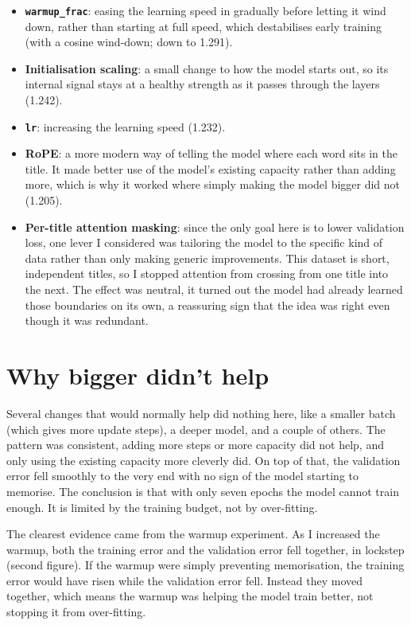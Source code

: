 \documentclass[11pt]{article}
\begin{document}
\begin{itemize}
\setlength{\itemsep}{2pt}
\item \textbf{\texttt{warmup\_frac}}: easing the learning speed in gradually before
letting it wind down, rather than starting at full speed, which destabilises early
training (with a cosine wind-down; down to 1.291).
\item \textbf{Initialisation scaling}: a small change to how the model starts out,
so its internal signal stays at a healthy strength as it passes through the layers
(1.242).
\item \textbf{\texttt{lr}}: increasing the learning speed (1.232).
\item \textbf{RoPE}: a more modern way of telling the model where each word sits in
the title. It made better use of the model's existing capacity rather than adding
more, which is why it worked where simply making the model bigger did not (1.205).
\item \textbf{Per-title attention masking}: since the only goal here is to lower
validation loss, one lever I considered was tailoring the model to the specific
kind of data rather than only making generic improvements. This dataset is short,
independent titles, so I stopped attention from crossing from one title into the
next. The effect was neutral, it turned out the model had already learned those
boundaries on its own, a reassuring sign that the idea was right even though it was
redundant.
\end{itemize}

\section{Why bigger didn't help}
Several changes that would normally help did nothing here, like a smaller batch (which
gives more update steps), a deeper model, and a couple of others. The pattern was
consistent, adding more steps or more capacity did not help, and only using the
existing capacity more cleverly did. On top of that, the validation error fell
smoothly to the very end with no sign of the model starting to memorise. The
conclusion is that with only seven epochs the model cannot train enough. It is limited
by the training budget, not by over-fitting.

The clearest evidence came from the warmup experiment. As I increased the warmup,
both the training error and the validation error fell together, in lockstep
(second figure). If the warmup were simply preventing memorisation, the training
error would have risen while the validation error fell. Instead they moved
together, which means the warmup was helping the model train better, not stopping
it from over-fitting.
\end{document}
